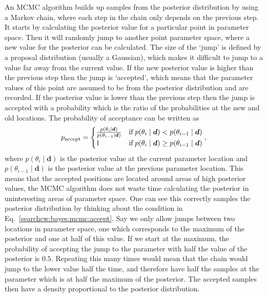 An \gls{MCMC} algorithm
builds up samples from the posterior distribution by using a Markov chain, where each
step in the chain only depends on the previous step.  
It starts by calculating the posterior value for a particular point in parameter space. Then it will
randomly jump to another point parameter space, where a new value for the
posterior can be calculated.  The size of the `jump' is defined by a proposal distribution (usually a Gaussian), which makes it difficult to jump to a value far away from the current value. If the new posterior value is higher than the
previous step then the jump is `accepted', which means that the parameter
values of this point are assumed to be from the posterior distribution and are recorded.  If the posterior value is lower than the
previous step then the jump is accepted with a probability which is the ratio of the probabilities at the new and old locations.
The probability of acceptance can be written as
\begin{equation}
\label{searchcw:bayes:mcmc:accept}
	p_{\rm{accept}} = 
	\begin{cases}
		\frac{p(\theta_i \mid \bm{d})}{p(\theta_{i-1} \mid \bm{d})} & \text{if} \; p(\theta_i \mid \bm{d}) < p(\theta_{i-1} \mid \bm{d}) \\
		1 & \text{if} \; p(\theta_i \mid \bm{d}) \geq p(\theta_{i-1} \mid \bm{d}) \\
	\end{cases},
\end{equation}
where $p(\theta_i \mid \bm{d})$ is the posterior value at the current parameter location and $p(\theta_{i-1} \mid \bm{d})$ is the posterior value at the previous parameter location. 
This means that the accepted positions are located around areas of high
posterior values, the \gls{MCMC} algorithm does not waste time calculating the
posterior in uninteresting areas of parameter space.  
One can see this correctly samples the posterior distribution by thinking about the condition in Eq.~\ref{searchcw:bayes:mcmc:accept}. Say we only allow jumps between two locations in parameter space, one which corresponds to the maximum of the posterior and one at half of this value. 
If we start at the maximum, the probability of accepting the jump to the parameter with half the value of the posterior is $0.5$. Repeating this many times would mean that the chain would jump to the lower value half the time, and therefore have half the samples at the parameter which is at half the maximum of the posterior. 
The accepted samples then have a density proportional to the posterior distribution. 
